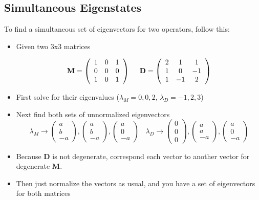 \subsection{Simultaneous Eigenstates}
To find a simultaneous set of eigenvectors for two operators, follow this:
\begin{itemize}
\item Given two 3x3 matrices

$$\bf{M} = 
\left(
{\begin{array}{ccc}
1&0&1\\
0&0&0\\
1&0&1\\
\end{array}}
\right)
~~~~\bf{D} = 
\left(
{\begin{array}{ccc}
2&1&1\\
1&0&-1\\
1&-1&2\\
\end{array}}
\right)$$

\item First solve for their eigenvalues ($\lambda_M = 0,0,2$, $\lambda_D = -1,2,3$)
\item Next find both sets of unnormalized eigenvectors
$$
\lambda_M\rightarrow  
\left(
{\begin{array}{c}
a\\
b\\
-a
\end{array}}
\right),
\left(
{\begin{array}{c}
a\\
b\\
-a
\end{array}}
\right),
\left(
{\begin{array}{c}
a\\
0\\
-a
\end{array}}
\right)~~~~
\lambda_D\rightarrow
\left(
{\begin{array}{c}
0\\
0\\
0
\end{array}}
\right),\left(
{\begin{array}{c}
a\\
a\\
-a
\end{array}}
\right),
\left(
{\begin{array}{c}
a\\
0\\
-a
\end{array}}
\right)$$
\item Because $\textbf{D}$ is not degenerate, correspond each vector to another vector for degenerate $\textbf{M}$. 
\item Then just normalize the vectors as usual, and you have a set of eigenvectors for both matrices
\end{itemize}



